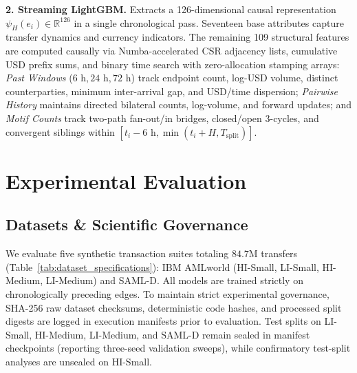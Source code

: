 \documentclass[sigconf,nonacm]{acmart}
\begin{document}
\textbf{2. Streaming LightGBM.} Extracts a 126-dimensional causal representation $\psi_H(e_i) \in \mathbb{R}^{126}$ in a single chronological pass. Seventeen base attributes capture transfer dynamics and currency indicators. The remaining 109 structural features are computed causally via Numba-accelerated CSR adjacency lists, cumulative USD prefix sums, and binary time search with zero-allocation stamping arrays: \emph{Past Windows} ($6\text{ h}, 24\text{ h}, 72\text{ h}$) track endpoint count, log-USD volume, distinct counterparties, minimum inter-arrival gap, and USD/time dispersion; \emph{Pairwise History} maintains directed bilateral counts, log-volume, and forward updates; and \emph{Motif Counts} track two-path fan-out/in bridges, closed/open 3-cycles, and convergent siblings within $[t_i - 6\text{ h}, \min(t_i + H, T_{\text{split}})]$.

\section{Experimental Evaluation}
\label{sec:experiments}

\subsection{Datasets \& Scientific Governance}
We evaluate five synthetic transaction suites totaling $84.7\text{M}$ transfers (Table~\ref{tab:dataset_specifications}): IBM AMLworld (HI-Small, LI-Small, HI-Medium, LI-Medium) and SAML-D. All models are trained strictly on chronologically preceding edges. To maintain strict experimental governance, SHA-256 raw dataset checksums, deterministic code hashes, and processed split digests are logged in execution manifests prior to evaluation. Test splits on LI-Small, HI-Medium, LI-Medium, and SAML-D remain sealed in manifest checkpoints (reporting three-seed validation sweeps), while confirmatory test-split analyses are unsealed on HI-Small.
\end{document}
